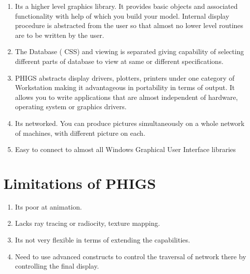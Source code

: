     \begin{enumerate}

    \item
    Its a higher level graphics library. It provides basic objects and
    associated functionality with help of which you build your model.
    Internal display procedure is abstracted from the user so that
    almost no lower level routines are to be written by the user.

    \item
    The Database ( CSS) and viewing is separated giving capability of
    selecting different parts of database to view at same or different
    specifications.

    \item
    PHIGS abstracts display drivers, plotters, printers under one category
    of Workstation making it advantageous in portability in terms of
    output. It allows you to write applications that are almost independent
    of hardware, operating system or graphics drivers.

    \item
    Its networked. You can produce pictures simultaneously on a whole
    network of machines, with different picture on each.

    \item
    Easy to connect to almost all Windows Graphical User Interface libraries

    \end{enumerate}

    \section{Limitations of PHIGS}

    \begin{enumerate}

    \item
    Its poor at animation.
    \item
    Lacks ray tracing or radiocity, texture mapping.
    \item
    Its not very flexible in terms of extending the capabilities.
    \item
    Need to use advanced constructs to control the traversal of network
        there by controlling the final display.

    \end{enumerate}

